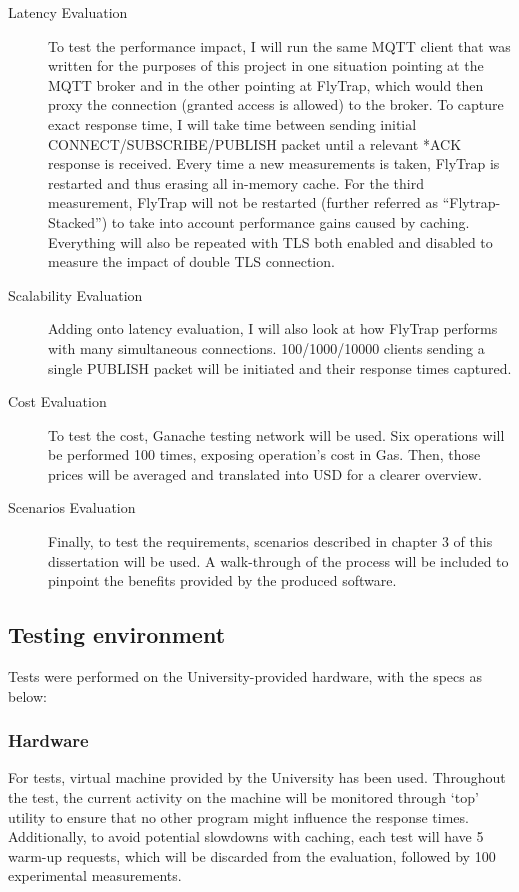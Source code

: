 \begin{description}
    \item[Latency Evaluation] To test the performance impact, I will run the same MQTT client that was written for the purposes of this project in one situation pointing at the MQTT broker and in the other pointing at FlyTrap, which would then proxy the connection (granted access is allowed) to the broker. To capture exact response time, I will take time between sending initial CONNECT/SUBSCRIBE/PUBLISH packet until a relevant *ACK response is received. Every time a new measurements is taken, FlyTrap is restarted and thus erasing all in-memory cache. For the third measurement, FlyTrap will not be restarted (further referred as ``Flytrap-Stacked'') to take into account performance gains caused by caching. Everything will also be repeated with TLS both enabled and disabled to measure the impact of double TLS connection.
    \item[Scalability Evaluation] Adding onto latency evaluation, I will also look at how FlyTrap performs with many simultaneous connections. 100/1000/10000 clients sending a single PUBLISH packet will be initiated and their response times captured. 
    \item[Cost Evaluation] To test the cost, Ganache testing network will be used. Six operations will be performed 100 times, exposing operation's cost in Gas. Then, those prices will be averaged and translated into USD for a clearer overview.
    \item[Scenarios Evaluation] Finally, to test the requirements, scenarios described in chapter 3 of this dissertation will be used. A walk-through of the process will be included to pinpoint the benefits provided by the produced software.
\end{description}

\subsection{Testing environment}
Tests were performed on the University-provided hardware, with the specs as below:
\subsubsection{Hardware}
For tests, virtual machine provided by the University has been used. Throughout the test, the current activity on the machine will be monitored through `top' utility to ensure that no other program might influence the response times. Additionally, to avoid potential slowdowns with caching, each test will have 5 warm-up requests, which will be discarded from the evaluation, followed by 100 experimental measurements.

